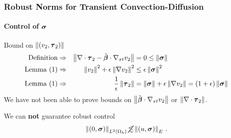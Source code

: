 \documentclass[18pt,xcolor=table]{beamer}
\begin{document}
\begin{frame}[t]
\frametitle{Robust Norms for Transient Convection-Diffusion}
\framesubtitle{Control of $\boldsymbol\sigma$}
\begin{block}{Bound on $\left\| (v_2,\boldsymbol\tau_2) \right\|$}
\vspace{-2ex}
\begin{align*}
\text{Definition}\Rightarrow&&\left\| \nabla\cdot\boldsymbol\tau_2-\tilde{\boldsymbol\beta}\cdot\nabla_{xt} v_2 \right\|&=0\leq\left\| \boldsymbol\sigma \right\|\\
\text{Lemma (1)}\Rightarrow&&\left\| v_2 \right\|^2+\epsilon\left\| \nabla v_2 \right\|^2&\leq\epsilon\left\| \boldsymbol\sigma \right\|^2\\
\text{Lemma (1)}\Rightarrow&&\frac{1}{\epsilon}\left\| \boldsymbol\tau_2 \right\|&=\left\| \boldsymbol\sigma \right\|+\epsilon\left\| \nabla v_2 \right\|=(1+\epsilon)\left\| \boldsymbol\sigma \right\|
\end{align*}
We have not been able to prove bounds on $\left\| \tilde{\boldsymbol\beta}\cdot\nabla_{xt} v_2 \right\|$ or $\left\| \nabla\cdot\boldsymbol\tau_2 \right\|$. 
\bigskip

We can \textbf{not} guarantee robust control
\[
\left\| (0,\boldsymbol\sigma) \right\|_{L^2(\Omega_h)}\cancel{\lesssim}\left\| (u,\boldsymbol\sigma) \right\|_E\,.
\]
\end{block}
\end{frame}
\end{document}
